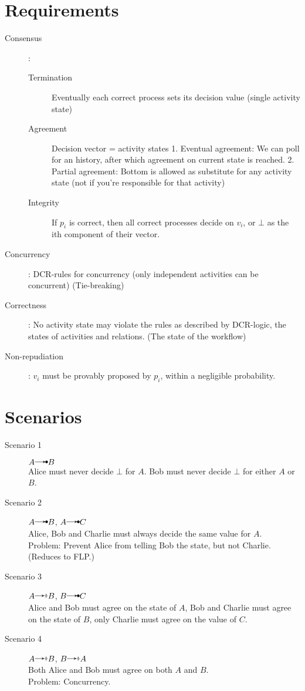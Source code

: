 \documentclass{article}
\begin{document}
	\section*{Requirements}
	\begin{description}
		\item[Consensus]:
			\begin{description}
				\item[Termination] Eventually each correct process sets its decision value (single activity state)
				\item[Agreement] Decision vector = activity states
								1. Eventual agreement: We can poll for an history, after which agreement on current state is reached.
								2. Partial agreement: Bottom is allowed as substitute for any activity state (not if you're responsible for that activity)
				\item[Integrity] If $p_i$ is correct, then all correct processes decide on $v_i$, or $\bot$ as the ith component of their vector.
			\end{description}
		\item[Concurrency]: DCR-rules for concurrency (only independent activities can be concurrent) (Tie-breaking)
		\item[Correctness]: No activity state may violate the rules as described by DCR-logic, the states of activities and relations. (The state of the workflow)
		\item[Non-repudiation]: $v_i$ must be provably proposed by $p_i$, within a negligible probability.
	\end{description}

	\section*{Scenarios}
	\begin{description}
		\item[Scenario 1] 
			$A\crel B$\\
			Alice must never decide $\bot$ for $A$. Bob must never decide $\bot$ for either $A$ or $B$.
		\item[Scenario 2]
			$A\crel B$, $A\crel C$\\
			Alice, Bob and Charlie must always decide the same value for $A$.\\
			Problem: Prevent Alice from telling Bob the state, but not Charlie. (Reduces to FLP.)
		\item[Scenario 3]
			$A\erel B$, $B\crel C$\\
			Alice and Bob must agree on the state of $A$, Bob and Charlie must agree on the state of $B$, only Charlie must agree on the value of $C$.
		\item[Scenario 4]
			$A\erel B$, $B\erel A$\\
			Both Alice and Bob must agree on both $A$ and $B$.\\
			Problem: Concurrency.
		
			
	\end{description}
\end{document}
